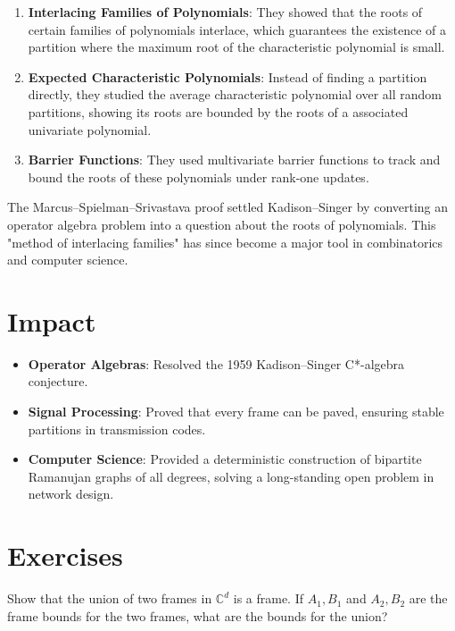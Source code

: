\begin{enumerate}
\item \textbf{Interlacing Families of Polynomials}: They showed that the roots of certain families of polynomials interlace, which guarantees the existence of a partition where the maximum root of the characteristic polynomial is small.
\item \textbf{Expected Characteristic Polynomials}: Instead of finding a partition directly, they studied the average characteristic polynomial over all random partitions, showing its roots are bounded by the roots of a associated univariate polynomial.
\item \textbf{Barrier Functions}: They used multivariate barrier functions to track and bound the roots of these polynomials under rank-one updates.
\end{enumerate}

\begin{highlightbox}
The Marcus--Spielman--Srivastava proof settled Kadison--Singer by converting an operator algebra problem into a question about the roots of polynomials. This "method of interlacing families" has since become a major tool in combinatorics and computer science.
\end{highlightbox}

\section{Impact}
\begin{itemize}
\item \textbf{Operator Algebras}: Resolved the 1959 Kadison--Singer C*-algebra conjecture.
\item \textbf{Signal Processing}: Proved that every frame can be paved, ensuring stable partitions in transmission codes.
\item \textbf{Computer Science}: Provided a deterministic construction of bipartite Ramanujan graphs of all degrees, solving a long-standing open problem in network design.
\end{itemize}

\section{Exercises}

\begin{exercise}[Basic]
Show that the union of two frames in $\mathbb{C}^d$ is a frame. If $A_1, B_1$ and $A_2, B_2$ are the frame bounds for the two frames, what are the bounds for the union?
\end{exercise}

